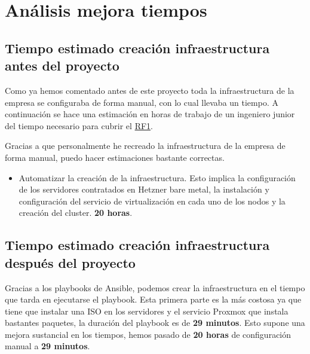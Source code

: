 \section{Análisis mejora tiempos}
\label{analisis_tiempos} 
\subsection{Tiempo estimado creación infraestructura antes del proyecto}
\begin{text}
        Como ya hemos comentado antes de este proyecto toda la infraestructura de la empresa se configuraba de forma manual, con lo cual llevaba un tiempo. A continuación se hace una estimación en horas de trabajo de un ingeniero junior del tiempo necesario para cubrir el \hyperref[RF1]{RF1}.

        Gracias a que personalmente he recreado la infraestructura de la empresa de forma manual, puedo hacer estimaciones bastante correctas.

        \begin{itemize}
                \item Automatizar la creación de la infraestructura. Esto implica la configuración de los servidores contratados en Hetzner bare metal, la instalación y configuración del servicio de virtualización en cada uno de los nodos y la creación del cluster.  \textbf{20 horas}.
        \end{itemize}

\end{text}

\subsection{Tiempo estimado creación infraestructura después del proyecto}
\begin{text}
        Gracias a los playbooks de Ansible, podemos crear la infraestructura en el tiempo que tarda en ejecutarse el playbook. Esta primera parte es la más costosa ya que tiene que instalar una ISO en los servidores y el servicio Proxmox que instala bastantes paquetes, la duración del playbook es de \textbf{29 minutos}. Esto supone una mejora sustancial en los tiempos, hemos pasado de \textbf{20 horas} de configuración manual a \textbf{29 minutos}.
\end{text}

